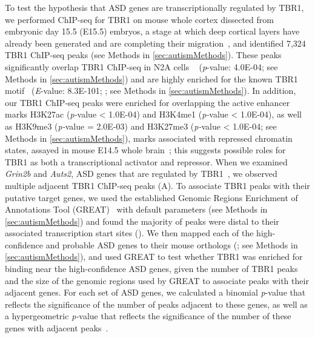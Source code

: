 To test the hypothesis that ASD genes are transcriptionally regulated by
TBR1, we performed ChIP-seq for TBR1 on mouse whole cortex dissected
from embryonic day 15.5 (E15.5) embryos, a stage at which deep cortical
layers have already been generated and are completing their migration~\citep{McConnell:1991hh,Molyneaux:2007hy}, and identified 7,324 TBR1
ChIP-seq peaks (see Methods in \ref{sec:autismMethods}). These peaks significantly overlap TBR1
ChIP-seq in N2A cells ~\citep{Han:2011fs} (\emph{p}-value: 4.0E-04; see
Methods in \ref{sec:autismMethods}) and are highly enriched for the known TBR1 motif~\citep{Jolma:2013fh} (\emph{E}-value: 8.3E-101; ; see Methods in \ref{sec:autismMethods}). In
addition, our TBR1 ChIP-seq peaks were enriched for overlapping the
active enhancer marks H3K27ac (\emph{p-}value \textless{} 1.0E-04) and
H3K4me1 (\emph{p-}value \textless{} 1.0E-04), as well as H3K9me3
(\emph{p-}value = 2.0E-03) and H3K27me3 (\emph{p-}value \textless{}
1.0E-04; see Methods in \ref{sec:autismMethods}), marks associated with repressed chromatin states,
assayed in mouse E14.5 whole brain~\citep{ENCODEProjectConsortium:2012gc};
this suggests possible roles for TBR1 as both a transcriptional
activator and repressor. When we examined \emph{Grin2b} and
\emph{Auts2}, ASD genes that are regulated by TBR1~\citep{Bedogni:2010ew, Chuang:2014bc}, we observed multiple adjacent TBR1 ChIP-seq peaks
(A). To associate TBR1 peaks with their putative target genes, we
used the established Genomic Regions Enrichment of Annotations Tool
(GREAT)~\citep{McLean:2010iq} with default parameters (see Methods in \ref{sec:autismMethods}) and
found the majority of peaks were distal to their associated
transcription start sites (). We then mapped each of
the high-confidence and probable ASD genes to their mouse orthologs
(; see Methods in \ref{sec:autismMethods}), and used GREAT to test whether TBR1
was enriched for binding near the high-confidence ASD genes, given the
number of TBR1 peaks and the size of the genomic regions used by GREAT
to associate peaks with their adjacent genes. For each set of ASD genes,
we calculated a binomial \emph{p}-value that reflects the significance
of the number of peaks adjacent to these genes, as well as a
hypergeometric \emph{p-}value that reflects the significance of the
number of these genes with adjacent peaks~\citep{McLean:2010iq}.

